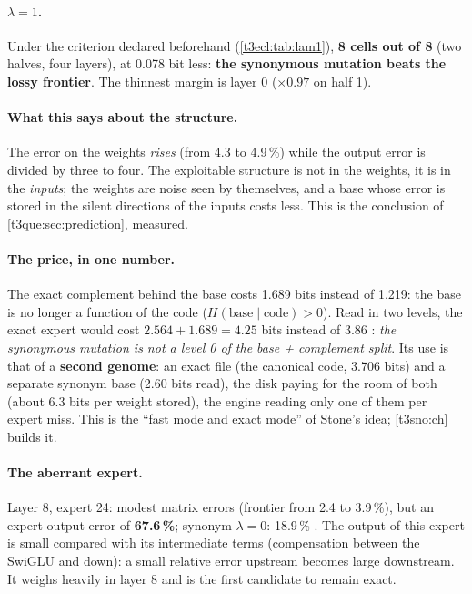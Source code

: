\paragraph{$\lambda = 1$.} Under the criterion declared beforehand (\cref{t3ecl:tab:lam1}), \textbf{8 cells out of 8} (two halves, four layers), at 0.078 bit less: \textbf{the synonymous mutation beats the lossy frontier}. The thinnest margin is layer 0 ($\times 0.97$ on half 1).

\paragraph{What this says about the structure.} The error on the weights \emph{rises} (from 4.3 to 4.9\,\%) while the output error is divided by three to four. The exploitable structure is not in the weights, it is in the \emph{inputs}; the weights are noise seen by themselves, and a base whose error is stored in the silent directions of the inputs costs less. This is the conclusion of \cref{t3que:sec:prediction}, measured.

\paragraph{The price, in one number.} The exact complement behind the base costs 1.689 bits instead of 1.219: the base is no longer a function of the code ($H(\text{base}\mid\text{code}) > 0$). Read in two levels, the exact expert would cost $2.564 + 1.689 = 4.25$ bits instead of 3.86 \calc: \emph{the synonymous mutation is not a level 0 of the base + complement split}. Its use is that of a \textbf{second genome}: an exact file (the canonical code, 3.706 bits) and a separate synonym base (2.60 bits read), the disk paying for the room of both (about 6.3 bits per weight stored), the engine reading only one of them per expert miss. This is the ``fast mode and exact mode'' of Stone's idea; \cref{t3sno:ch} builds it.

\paragraph{The aberrant expert.} Layer 8, expert 24: modest matrix errors (frontier from 2.4 to 3.9\,\%), but an expert output error of \textbf{67.6\,\%}; synonym $\lambda = 0$: 18.9\,\% \mes. The output of this expert is small compared with its intermediate terms (compensation between the SwiGLU and down): a small relative error upstream becomes large downstream. It weighs heavily in layer 8 and is the first candidate to remain exact.

